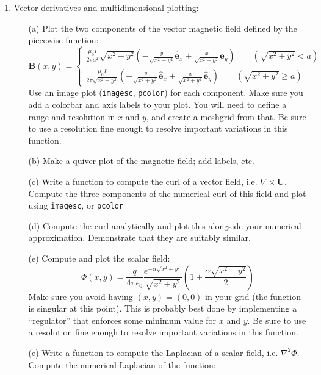 \documentclass{article}
\begin{document}
\begin{enumerate}
  \item  Vector derivatives and multidimensional plotting:  
  \begin{itemize}  
    \item[(a)] Plot the two components of the vector magnetic field defined by the piecewise function:
    \begin{equation}
      \mathbf{B}(x,y)= \left\{
      \begin{array}{c}
      \frac{\mu_0 I}{2 \pi a^2} \sqrt{x^2+y^2} \left( - \frac{y}{\sqrt{x^2+y^2}}\hat{\mathbf{e}}_x + \frac{x}{\sqrt{x^2+y^2}} \hat{\mathbf{e}}_y \right) \qquad \left( \sqrt{x^2+y^2} < a \right)
      \\
      \frac{\mu_0 I}{2 \pi \sqrt{x^2+y^2}} \left( - \frac{y}{\sqrt{x^2+y^2}} \hat{\mathbf{e}}_x + \frac{x}{\sqrt{x^2+y^2}} \hat{\mathbf{e}}_y \right) \qquad \left( \sqrt{x^2+y^2} \ge a \right)
      \end{array}
      \right.      
    \end{equation}
    Use an image plot (\texttt{imagesc}, \texttt{pcolor}) for each component.  Make sure you add a colorbar and axis labels to your plot.  You will need to define a range and resolution in $x$ and $y$, and create a meshgrid from that.  Be sure to use a resolution fine enough to resolve important variations in this function.  
    \item[(b)]  Make a quiver plot of the magnetic field; add labels, etc.
    \item[(c)]  Write a function to compute the curl of a vector field, i.e. $\nabla \times \mathbf{U}$.  Compute the three components of the numerical curl of this field and plot using \texttt{imagesc}, or \texttt{pcolor}
    \item[(d)]  Compute the curl analytically and plot this alongside your numerical approximation.  Demonstrate that they are suitably similar.  
    \item[(e)]  Compute and plot the scalar field:
    \begin{equation}
    \Phi(x,y)=\frac{q}{4 \pi \epsilon_0} \frac{e^{-\alpha \sqrt{x^2+y^2} }}{\sqrt{x^2+y^2}} \left(1+\frac{\alpha \sqrt{x^2+y^2}} {2} \right)
    \end{equation}
    Make sure you avoid having $(x,y)=(0,0)$ in your grid (the function is singular at this point).  This is probably best done by implementing a ``regulator'' that enforces some minimum value for $x$ and $y$.  Be sure to use a resolution fine enough to resolve important variations in this function.
    \item[(e)]  Write a function to compute the Laplacian of a scalar field, i.e. $\nabla^2 \Phi$.  Compute the numerical Laplacian of the function:
    

\end{itemize}
\end{enumerate}
\end{document}
